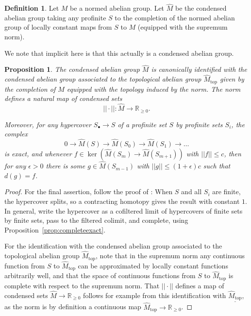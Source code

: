 \documentclass[11pt]{amsbook}
\numberwithin{equation}{section}
\numberwithin{theorem}{section}
\newtheorem{proposition}[theorem]{Proposition}
\theoremstyle{definition}
\newtheorem{definition}[theorem]{Definition}
\begin{document}
\begin{definition} Let $M$ be a normed abelian group. Let $\widehat{M}$ be the condensed abelian group taking any profinite $S$ to the completion of the normed abelian group of locally constant maps from $S$ to $M$ (equipped with the supremum norm).
\end{definition}

We note that implicit here is that this actually is a condensed abelian group.

\begin{proposition}\label{prop:normedcompletion} The condensed abelian group $\widehat{M}$ is canonically identified with the condensed abelian group associated to the topological abelian group $\widehat{M}_{\mathrm{top}}$ given by the completion of $M$ equipped with the topology induced by the norm. The norm defines a natural map of condensed sets
\[
||\cdot||: \widehat{M}\to \mathbb R_{\geq 0}.
\]

Moreover, for any hypercover $S_\bullet\to S$ of a profinite set $S$ by profinite sets $S_i$, the complex
\[
0\to \widehat{M}(S)\to \widehat{M}(S_0)\to \widehat{M}(S_1)\to \ldots
\]
is exact, and whenever $f\in \ker(\widehat{M}(S_m)\to \widehat{M}(S_{m+1}))$ with $||f||\leq c$, then for any $\epsilon>0$ there is some $g\in \widehat{M}(S_{m-1})$ with $||g||\leq (1+\epsilon)c$ such that $d(g)=f$.
\end{proposition}

\begin{proof} For the final assertion, follow the proof of \cite[Theorem 3.3]{Condensed}: When $S$ and all $S_i$ are finite, the hypercover splits, so a contracting homotopy gives the result with constant $1$. In general, write the hypercover as a cofiltered limit of hypercovers of finite sets by finite sets, pass to the filtered colimit, and complete, using Proposition~\ref{prop:completeexact}.

For the identification with the condensed abelian group associated to the topological abelian group $\widehat{M}_{\mathrm{top}}$, note that in the supremum norm any continuous function from $S$ to $\widehat{M}_{\mathrm{top}}$ can be approximated by locally constant functions arbitrarily well, and that the space of continuous functions from $S$ to $\widehat{M}_{\mathrm{top}}$ is complete with respect to the supremum norm. That $||\cdot||$ defines a map of condensed sets $\widehat{M}\to \mathbb R_{\geq 0}$ follows for example from this identification with $\underline{\widehat{M}_{\mathrm{top}}}$, as the norm is by definition a continuous map $\widehat{M}_{\mathrm{top}}\to \mathbb R_{\geq 0}$.
\end{proof}
\end{document}
